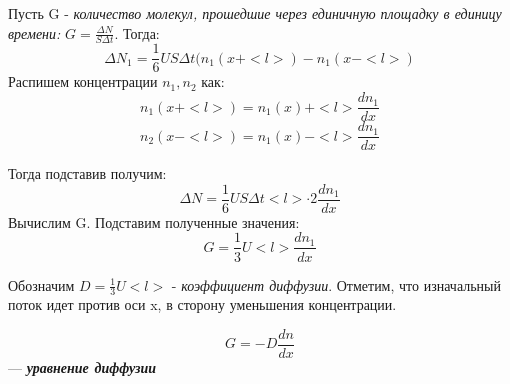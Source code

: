\documentclass[12pt,a4paper]{report}
\begin{document}
\vspace{4px}

Пусть G - \textit{количество молекул, прошедшие через единичную площадку в единицу времени:} $G = \frac{\Delta N}{S \Delta t}$. Тогда:
\[\Delta N_1 = \frac{1}{6}US\Delta t(n_1(x+<l>) - n_1(x-<l>)\]
Распишем концентрации $n_1, n_2$ как:
\[n_1(x+<l>) = n_1(x) + <l>\frac{dn_1}{dx}\]
\[n_2(x-<l>) = n_1(x) - <l>\frac{dn_1}{dx}\]

Тогда подставив получим:
\[ \Delta N = \frac{1}{6}US\Delta t <l> \cdot 2 \frac{dn_1}{dx}\]
Вычислим G. Подставим полученные значения:
\[G = \frac{1}{3}U <l> \frac{dn_1}{dx}\]

Обозначим $ D = \frac{1}{3}U <l>$ - \textit{коэффициент диффузии}. Отметим, что изначальный поток идет против оси x, в сторону уменьшения концентрации.

\[G = -D \frac{dn}{dx}\]
--- \textbf{\textit{уравнение диффузии}}
\end{document}
